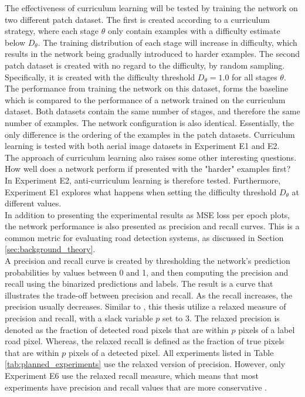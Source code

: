 The effectiveness of curriculum learning will be tested by training the network on two different patch dataset. The first is created according to a curriculum strategy, where each stage $\theta$ only contain examples with a difficulty estimate below $D_\theta$. The training distribution of each stage will increase in difficulty, which results in the network being gradually introduced to harder examples. The second patch dataset is created with no regard to the difficulty, by random sampling. Specifically, it is created with the difficulty threshold $D_\theta =1.0$ for all stages $\theta$. The performance from training the network on this dataset, forms the baseline which is compared to the performance of a network trained on the curriculum dataset. Both datasets contain the same number of stages, and therefore the same number of examples. The network configuration is also identical. Essentially, the only difference is the ordering of the examples in the patch datasets. Curriculum learning is tested with both aerial image datasets in Experiment E1 and E2.\\

The approach of curriculum learning also raises some other interesting questions. How well does a network perform if presented with the "harder" examples first? In Experiment E2, anti-curriculum learning is therefore tested. Furthermore, Experiment E1 explores what happens when setting the difficulty threshold $D_\theta$ at different values.\\

In addition to presenting the experimental results as MSE loss per epoch plots, the network performance is also presented as precision and recall curves. This is a common metric for evaluating road detection systems, as discussed in Section \ref{sec:background_theory}.\\

A precision and recall curve is created by thresholding the network's prediction probabilities by values between 0 and 1, and then computing the precision and recall using the binarized predictions and labels. The result is a curve that illustrates the trade-off between precision and recall. As the recall increases, the precision usually decreases. Similar to \citep{Mnih_aerial_images_noisy}, this thesis utilize a relaxed measure of precision and recall, with a slack variable $p$ set to 3. The relaxed precision is denoted as the fraction of detected road pixels that are within $p$ pixels of a label road pixel. Whereas, the relaxed recall is defined as the fraction of true pixels that are within $p$ pixels of a detected pixel. All experiments listed in Table \ref{tab:planned_experiments} use the relaxed version of precision. However, only Experiment E6 use the relaxed recall measure, which means that most experiments have precision and recall values that are more conservative .\\

